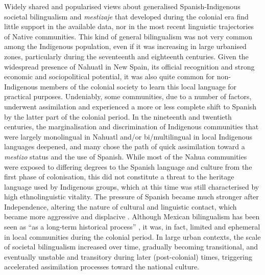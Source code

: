 \documentclass[output=paper,hidelinks]{langscibook}
\begin{document}
Widely shared and popularised views about generalised Spanish-Indigenous societal bilingualism and \textit{mestizaje} that developed during the colonial era find little support in the available data, nor in the most recent linguistic trajectories of Native communities. This kind of general bilingualism was not very common among the Indigenous population, even if it was increasing in large urbanised zones, particularly during the seventeenth and eighteenth centuries. Given the widespread presence of Nahuatl in New Spain, its official recognition and strong economic and sociopolitical potential, it was also quite common for non-Indige\-nous members of the colonial society to learn this local language for practical purposes. Undeniably, some communities, due to a number of factors, underwent assimilation and experienced a more or less complete shift to Spanish by the latter part of the colonial period. In the nineteenth and twentieth centuries, the marginalisation and discrimination of Indigenous communities that were largely monolingual in Nahuatl and/or bi/multilingual in local Indigenous languages deepened, and many chose the path of quick assimilation toward a \textit{mestizo} status and the use of Spanish. While most of the Nahua communities were exposed to differing degrees to the Spanish language and culture from the first phase of colonisation, this did not constitute a threat to the heritage language used by Indigenous groups, which at this time was still characterised by high ethnolinguistic vitality. The pressure of Spanish became much stronger after Independence, altering the nature of cultural and linguistic contact, which became more aggressive and displacive \citep{olko2018}. Although Mexican bilingualism has been seen as “as a long-term historical process” \citep[332]{floresfarfan2003}, it was, in fact, limited and ephemeral in local communities during the colonial period. In large urban contexts, the scale of societal bilingualism increased over time, gradually becoming transitional, and eventually unstable and transitory during later (post-colonial) times, triggering accelerated assimilation processes toward the national culture.
\end{document}
